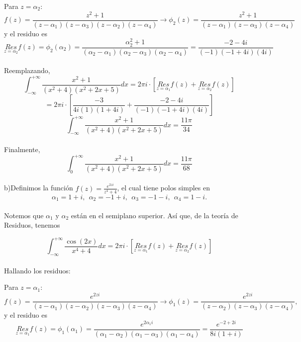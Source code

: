 \documentclass[a4paper,12pt]{article}
\begin{document}
Para $z = \alpha_{2}$:
\[
f(z) = \frac{z^{2} + 1}{\left( z - \alpha_{1} \right)\left( z - \alpha_{3} \right)\left( z - \alpha_{2} \right)\left( z - \alpha_{4} \right)} \rightarrow \phi_{2}(z) = \frac{z^{2} + 1}{\left( z - \alpha_{1} \right)\left( z - \alpha_{3} \right)\left( z - \alpha_{4} \right)}
\]
y el residuo es
\[
\underset{z = \alpha_{2}}{Res}{f(z)} = \phi_{2}\left( \alpha_{2} \right) = \frac{\alpha_{2}^{2} + 1}{\left( \alpha_{2} - \alpha_{1} \right)\left( \alpha_{2} - \alpha_{3} \right)\left( \alpha_{2} - \alpha_{4} \right)} = \frac{- 2 - 4i}{( - 1)( - 1 + 4i)(4i)}
\]\\
Reemplazando,
\[
\int_{- \infty}^{+ \infty}\frac{x^{2} + 1}{\left( x^{2} + 4 \right)\left( x^{2} + 2x + 5 \right)}dx = 2\pi i \cdot \left\lbrack \underset{z = \alpha_{1}}{Res}{f(z)} + \underset{z = \alpha_{2}}{Res}{f(z)} \right\rbrack
\]
\[
= 2\pi i \cdot \left\lbrack \frac{- 3}{4i(1)(1 + 4i)} + \frac{- 2 - 4i}{( - 1)( - 1 + 4i)(4i)} \right\rbrack
\]
\[
\int_{- \infty}^{+ \infty}\frac{x^{2} + 1}{\left( x^{2} + 4 \right)\left( x^{2} + 2x + 5 \right)}dx = \frac{11\pi}{34}
\]\\
Finalmente,
\[
\int_{0}^{+ \infty}\frac{x^{2} + 1}{\left( x^{2} + 4 \right)\left( x^{2} + 2x + 5 \right)}dx = \frac{11\pi}{68}
\]\\
b)Definimos la función $f(z) = \frac{e^{2zi}}{z^{4} + 4}$, el cual tiene polos simples en
\[
\alpha_{1} = 1 + i,\ \ \alpha_{2} = - 1 + i,\ \ \alpha_{3} = - 1 - i,\ \ \alpha_{4} = 1 - i.
\]\\
Notemos que $\alpha_{1}$ y $\alpha_{2}$ están en el semiplano superior.
Así que, de la teoría de Residuos, tenemos

\[
\int_{- \infty}^{+ \infty}\frac{\cos(2x)}{x^{4} + 4}dx = 2\pi i \cdot \left\lbrack \underset{z = \alpha_{1}}{Res}{f(z)} + \underset{z = \alpha_{2}}{Res}{f(z)} \right\rbrack
\]\\
Hallando los residuos:

Para $z = \alpha_{1}$:
\[
f(z) = \frac{e^{2zi}}{\left( z - \alpha_{1} \right)\left( z - \alpha_{2} \right)\left( z - \alpha_{3} \right)\left( z - \alpha_{4} \right)} \rightarrow \phi_{1}(z) = \frac{e^{2zi}}{\left( z - \alpha_{2} \right)\left( z - \alpha_{3} \right)\left( z - \alpha_{4} \right)},
\]
y el residuo es
\[
\underset{z = \alpha_{1}}{Res}{f(z)} = \phi_{1}\left( \alpha_{1} \right) = \frac{e^{2\alpha_{1}i}}{\left( \alpha_{1} - \alpha_{2} \right)\left( \alpha_{1} - \alpha_{3} \right)\left( \alpha_{1} - \alpha_{4} \right)} = \frac{e^{- 2 + 2i}}{8i(1 + i)}
\]
\end{document}
